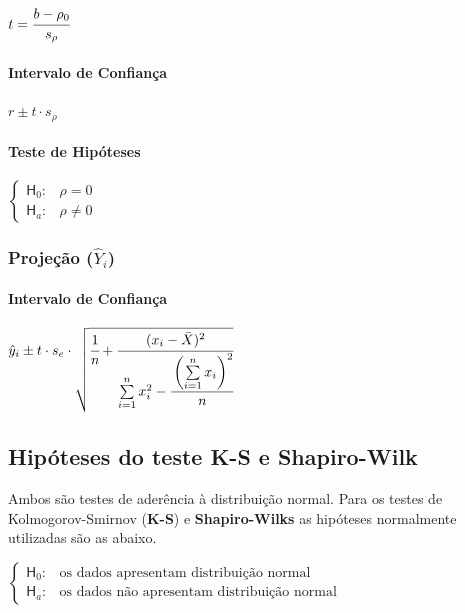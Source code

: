 			{\Large $ t = \cfrac{b - \rho_{0}}{s_{\rho}} $}

			\paragraph{Intervalo de Confiança}

				{\Large $ r \pm t \cdot s_{\rho} $}

			\paragraph{Teste de Hipóteses}

				$
					\begin{cases}
			        \mathsf{H}_{0} : & \rho = 0 \\
			        \mathsf{H}_{a} : & \rho \neq 0
			        \end{cases}
				$

		\subsubsection{Projeção ($ \hat Y_{i} $)}

			\paragraph{Intervalo de Confiança}

				{\Large $ \hat y_{i} \pm t \cdot s_{e} \cdot \sqrt{\cfrac{1}{n} + \cfrac{(x_{i} - \bar X)^{2}}{\sum \limits^{n}_{i=1} x^{2}_{i} - \cfrac{\left( \sum \limits^{n}_{i=1} x_{i} \right) ^{2}}{n}}} $}
				
	\subsection{Hipóteses do teste K-S e Shapiro-Wilk \cite{torres}}
		
		Ambos são testes de aderência à distribuição normal. Para os testes de Kolmogorov-Smirnov (\textbf{K-S}) e \textbf{Shapiro-Wilks} as hipóteses normalmente utilizadas são as abaixo. \cite{torres}

		\bigskip

		$
			\begin{cases}
			\mathsf{H}_{0} : & \text{os dados apresentam distribuição normal} \\
			\mathsf{H}_{a} : & \text{os dados não apresentam distribuição normal}
			\end{cases}
		$	
	
		\bigskip	
	
